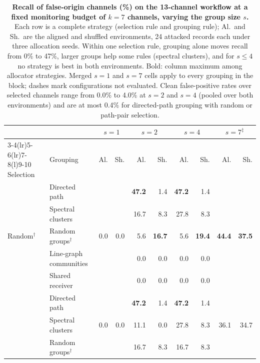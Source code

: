 \begin{table}[H]
\centering\small
\setlength{\tabcolsep}{4pt}
\caption{\textbf{Recall of false-origin channels (\%) on the 13-channel workflow at a fixed monitoring budget of $k{=}7$ channels, varying the group size $s$.} Each row is a complete strategy (selection rule and grouping rule); Al.\ and Sh.\ are the aligned and shuffled environments, 24 attacked records each under three allocation seeds. Within one selection rule, grouping alone moves recall from 0\% to 47\%, larger groups help some rules (spectral clusters), and for $s\le 4$ no strategy is best in both environments. Bold: column maximum among allocator strategies. Merged $s{=}1$ and $s{=}7$ cells apply to every grouping in the block; dashes mark configurations not evaluated. Clean false-positive rates over selected channels range from 0.0\% to 4.0\% at $s{=}2$ and $s{=}4$ (pooled over both environments) and are at most 0.4\% for directed-path grouping with random or path-pair selection.}\label{tab:strategies}
\begin{tabular}{@{}llrrrrrrrr@{}}
\toprule
 & & \multicolumn{2}{c}{$s{=}1$} & \multicolumn{2}{c}{$s{=}2$} & \multicolumn{2}{c}{$s{=}4$} & \multicolumn{2}{c}{$s{=}7^{\ddagger}$} \\
\cmidrule(lr){3-4}\cmidrule(lr){5-6}\cmidrule(lr){7-8}\cmidrule(l){9-10}
Selection & Grouping & Al. & Sh. & Al. & Sh. & Al. & Sh. & Al. & Sh. \\
\midrule
\multirow{5}{*}{Random$^\dagger$} & Directed path & \multirow{5}{*}{0.0} & \multirow{5}{*}{0.0} & \textbf{47.2} & 1.4 & \textbf{47.2} & 1.4 & \multirow{5}{*}{\textbf{44.4}} & \multirow{5}{*}{\textbf{37.5}} \\
 & Spectral clusters &  &  & 16.7 & 8.3 & 27.8 & 8.3 &  &  \\
 & Random groups$^\dagger$ &  &  & 5.6 & \textbf{16.7} & 5.6 & \textbf{19.4} &  &  \\
 & Line-graph communities &  &  & 0.0 & 0.0 & 0.0 & 0.0 &  &  \\
 & Shared receiver &  &  & 0.0 & 0.0 & 0.0 & 0.0 &  &  \\
\addlinespace[3pt]
\multirow{6}{*}{Path pairs} & Directed path & \multirow{6}{*}{0.0} & \multirow{6}{*}{0.0} & \textbf{47.2} & 1.4 & \textbf{47.2} & 1.4 & \multirow{6}{*}{36.1} & \multirow{6}{*}{34.7} \\
 & Spectral clusters &  &  & 11.1 & 0.0 & 27.8 & 8.3 &  &  \\
 & Random groups$^\dagger$ &  &  & 16.7 & 8.3 & 16.7 & 8.3 &  &  \\

\end{tabular}
\end{table}
